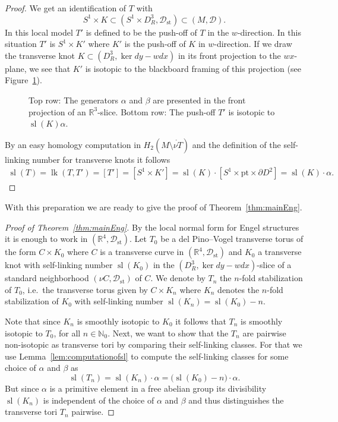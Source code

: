 \documentclass{amsart} %
\DeclareMathOperator{\lk}{lk}
\DeclareMathOperator{\slf}{sl}
\newcommand{\R}{\mathbb{R}}
\newcommand{\N}{\mathbb{N}}
\newcommand{\Dst}{\mathcal{D}_{\mathrm{st}}}
\newcommand{\D}{\mathcal{D}}
\theoremstyle{thm}
\theoremstyle{definition}
\begin{document}
\begin{proof}
We get an identification of $T$ with
\begin{equation*}
S^1\times K\subset (S^1\times D^3_R,\Dst)\subset (M,\D).
\end{equation*}
In this local model $T'$ is defined to be the push-off of $T$ in the $w$-direction. In this situation $T'$ is $S^1\times K'$ where $K'$ is the push-off of $K$ in $w$-direction. If we draw the transverse knot $K\subset (D^3_R,\ker dy-wdx)$ in its front projection to the $wx$-plane, we see that $K'$ is isotopic to the blackboard framing of this projection (see Figure~\ref{fig:transversetori}).

\begin{figure}[htbp] 
	\centering
	\def\svgwidth{0,99\columnwidth}
	
	\caption{Top row: The generators $\alpha$ and $\beta$ are presented in the front projection of an $\R^3$-slice. Bottom row: The push-off $T'$ is isotopic to $\slf(K)\alpha$.}
	\label{fig:transversetori}
\end{figure}
By an easy homology computation in $H_2(M\setminus\mathring{\nu T})$ and the definition of the self-linking number for transverse knots it follows
\begin{align*}
\slf(T)=\lk(T,T')=[T']=[S^1\times K']=\slf(K)\cdot[S^1\times\text{pt}\times\partial D^2]=\slf(K)\cdot\alpha.
\end{align*}
\end{proof}





With this preparation we are ready to give the proof of Theorem~\ref{thm:mainEng}.


\begin{proof}[Proof of Theorem~\ref{thm:mainEng}]
By the local normal form for Engel structures it is enough to work in $(\R^4,\Dst)$. Let $T_0$ be a del Pino--Vogel transverse torus of the form $C\times K_0$ where $C$ is a transverse curve in $(\R^4,\Dst)$ and $K_0$ a transverse knot with self-linking number $\slf(K_0)$ in the $(D^3_R,\ker dy-wdx)$-slice of a standard neighborhood $(\nu C,\Dst)$ of $C$.
We denote by $T_n$ the $n$-fold stabilization of $T_0$, i.e.\ the transverse torus given by $C\times K_n$ where $K_n$ denotes the $n$-fold stabilization of $K_0$ with self-linking number $\slf(K_n)=\slf(K_0)-n$.

Note that since $K_n$ is smoothly isotopic to $K_0$ it follows that $T_n$ is smoothly isotopic to $T_0$, for all $n\in\N_0$. Next, we want to show that the $T_n$ are pairwise non-isotopic as transverse tori by comparing their self-linking classes.
For that we use Lemma~\ref{lem:computationofsl} to compute the self-linking classes for some choice of $\alpha$ and $\beta$ as 
\begin{equation*}
\slf(T_n)=\slf(K_n) \cdot	\alpha=\big(\slf(K_0)-n\big)\cdot\alpha.
\end{equation*}
But since $\alpha$ is a primitive element in a free abelian group its divisibility $\slf(K_n)$ is independent of the choice of $\alpha$ and $\beta$ and thus distinguishes the transverse tori $T_n$ pairwise.
\end{proof}
\end{document}
